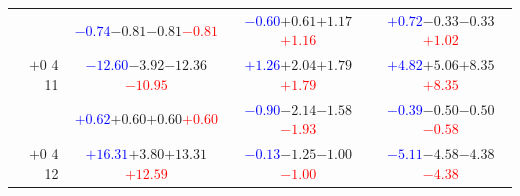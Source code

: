 \documentclass[compress]{beamer}
\begin{document}
\begin{frame}
\begin{tabular}{r | c | c | c}
          & \textcolor{blue}{$-0.74$}\hspace{0.1 cm}$-0.81$\hspace{0.1 cm}$-0.81$\hspace{0.1 cm}\textcolor{red}{$-0.81$} & \textcolor{blue}{$-0.60$}\hspace{0.1 cm}$+0.61$\hspace{0.1 cm}$+1.17$\hspace{0.1 cm}\textcolor{red}{$+1.16$} & \textcolor{blue}{$+0.72$}\hspace{0.1 cm}$-0.33$\hspace{0.1 cm}$-0.33$\hspace{0.1 cm}\textcolor{red}{$+1.02$} \\
$+$0 4 11 & \textcolor{blue}{$-12.60$}\hspace{0.1 cm}$-3.92$\hspace{0.1 cm}$-12.36$\hspace{0.1 cm}\textcolor{red}{$-10.95$} & \textcolor{blue}{$+1.26$}\hspace{0.1 cm}$+2.04$\hspace{0.1 cm}$+1.79$\hspace{0.1 cm}\textcolor{red}{$+1.79$} & \textcolor{blue}{$+4.82$}\hspace{0.1 cm}$+5.06$\hspace{0.1 cm}$+8.35$\hspace{0.1 cm}\textcolor{red}{$+8.35$} \\
          & \textcolor{blue}{$+0.62$}\hspace{0.1 cm}$+0.60$\hspace{0.1 cm}$+0.60$\hspace{0.1 cm}\textcolor{red}{$+0.60$} & \textcolor{blue}{$-0.90$}\hspace{0.1 cm}$-2.14$\hspace{0.1 cm}$-1.58$\hspace{0.1 cm}\textcolor{red}{$-1.93$} & \textcolor{blue}{$-0.39$}\hspace{0.1 cm}$-0.50$\hspace{0.1 cm}$-0.50$\hspace{0.1 cm}\textcolor{red}{$-0.58$} \\
$+$0 4 12 & \textcolor{blue}{$+16.31$}\hspace{0.1 cm}$+3.80$\hspace{0.1 cm}$+13.31$\hspace{0.1 cm}\textcolor{red}{$+12.59$} & \textcolor{blue}{$-0.13$}\hspace{0.1 cm}$-1.25$\hspace{0.1 cm}$-1.00$\hspace{0.1 cm}\textcolor{red}{$-1.00$} & \textcolor{blue}{$-5.11$}\hspace{0.1 cm}$-4.58$\hspace{0.1 cm}$-4.38$\hspace{0.1 cm}\textcolor{red}{$-4.38$} \\

\end{tabular}
\end{frame}
\end{document}
